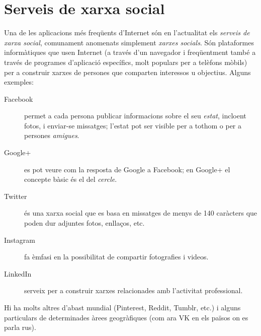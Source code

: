 \section{Serveis de xarxa social}

Una de les aplicacions més freqüents d'Internet són en l'actualitat
els \emph{serveis de xarxa social}, comunament anomenats simplement
\emph{xarxes socials}. Són plataformes informàtiques que usen Internet
(a través d'un navegador i freqüentment també a través de programes
d'aplicació específics, molt populars per a telèfons mòbils) per a
construir xarxes de persones que comparten interessos u
objectius. Alguns exemples:
\begin{description}
\item[Facebook] permet a cada persona publicar informacions sobre el seu \emph{estat}, incloent fotos, i enviar-se missatges; l'estat pot ser visible per a tothom o per a persones \emph{amigues}.
\item[Google+] es pot veure com la resposta de Google a Facebook; en Google+ el concepte bàsic és el del \emph{cercle}.
\item[Twitter] és una xarxa social que es basa en missatges de menys de 140 caràcters que poden dur adjuntes fotos, enllaços, etc.
\item[Instagram] fa èmfasi en la possibilitat de compartir fotografies i videos.
\item[LinkedIn] serveix per a construir xarxes relacionades amb
  l'activitat professional.
\end{description}
Hi ha molts altres d'abast mundial (Pinterest, Reddit, Tumblr, etc.) i alguns particulars de determinades àrees geogràfiques (com ara VK en els països on es parla rus).






